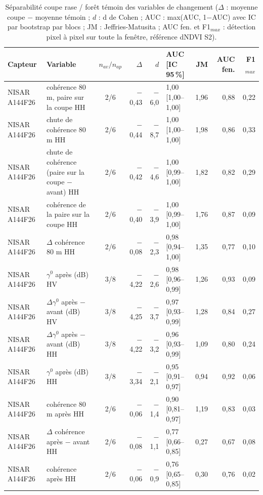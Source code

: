\begin{table}[htbp]
\centering
\scriptsize
\caption{Séparabilité coupe rase / forêt témoin des variables de changement ($\Delta$ : moyenne coupe $-$ moyenne témoin ; $d$ : d de Cohen ; AUC : max(AUC, 1$-$AUC) avec IC par bootstrap par blocs ; JM : Jeffries-Matusita ; AUC fen. et F1$_{max}$ : détection pixel à pixel sur toute la fenêtre, référence dNDVI S2).}
\label{tab-separability}
\begin{tabular}{llcrrlrrr}
\toprule
Capteur & Variable & $n_{av}/n_{ap}$ & $\Delta$ & $d$ & AUC [IC 95\,\%] & JM & AUC fen. & F1$_{max}$ \\
\midrule
NISAR A144F26 & cohérence 80 m, paire sur la coupe HH & 2/6 & $-$0{,}43 & $-$6{,}0 & 1{,}00 [1{,}00--1{,}00] & 1{,}96 & 0{,}88 & 0{,}22 \\
NISAR A144F26 & chute de cohérence 80 m HH & 2/6 & $-$0{,}44 & $-$8{,}7 & 1{,}00 [1{,}00--1{,}00] & 1{,}98 & 0{,}86 & 0{,}33 \\
NISAR A144F26 & chute de cohérence (paire sur la coupe $-$ avant) HH & 2/6 & $-$0{,}42 & $-$4{,}6 & 1{,}00 [0{,}99--1{,}00] & 1{,}82 & 0{,}82 & 0{,}29 \\
NISAR A144F26 & cohérence de la paire sur la coupe HH & 2/6 & $-$0{,}40 & $-$3{,}9 & 1{,}00 [0{,}99--1{,}00] & 1{,}76 & 0{,}87 & 0{,}09 \\
NISAR A144F26 & $\Delta$ cohérence 80 m HH & 2/6 & $-$0{,}08 & $-$2{,}3 & 0{,}98 [0{,}94--1{,}00] & 1{,}35 & 0{,}77 & 0{,}10 \\
NISAR A144F26 & $\gamma^0$ après (dB) HV & 3/8 & $-$4{,}22 & $-$2{,}6 & 0{,}98 [0{,}96--0{,}99] & 1{,}26 & 0{,}93 & 0{,}09 \\
NISAR A144F26 & $\Delta\gamma^0$ après $-$ avant (dB) HV & 3/8 & $-$4{,}25 & $-$3{,}7 & 0{,}97 [0{,}93--0{,}99] & 1{,}28 & 0{,}84 & 0{,}27 \\
NISAR A144F26 & $\Delta\gamma^0$ après $-$ avant (dB) HH & 3/8 & $-$4{,}22 & $-$3{,}2 & 0{,}96 [0{,}93--0{,}99] & 1{,}09 & 0{,}80 & 0{,}24 \\
NISAR A144F26 & $\gamma^0$ après (dB) HH & 3/8 & $-$3{,}34 & $-$2{,}1 & 0{,}95 [0{,}91--0{,}97] & 0{,}94 & 0{,}92 & 0{,}06 \\
NISAR A144F26 & cohérence 80 m après HH & 2/6 & $-$0{,}06 & $-$1{,}4 & 0{,}90 [0{,}81--0{,}97] & 1{,}19 & 0{,}83 & 0{,}03 \\
NISAR A144F26 & $\Delta$ cohérence après $-$ avant HH & 2/6 & $-$0{,}08 & $-$1{,}1 & 0{,}77 [0{,}66--0{,}85] & 0{,}27 & 0{,}67 & 0{,}08 \\
NISAR A144F26 & cohérence après HH & 2/6 & $-$0{,}06 & $-$0{,}9 & 0{,}76 [0{,}65--0{,}85] & 0{,}30 & 0{,}76 & 0{,}02 \\

\end{tabular}
\end{table}
